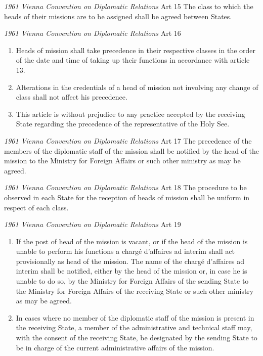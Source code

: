 \begin{conventiondetails}{\textit{1961 Vienna Convention on Diplomatic Relations} Art 15}
    \flushleft
    The class to which the heads of their missions are to be assigned shall be agreed between States.
\end{conventiondetails}

\begin{conventiondetails}{\textit{1961 Vienna Convention on Diplomatic Relations} Art 16}
    \flushleft
    \begin{enumerate}
        \item Heads of mission shall take precedence in their respective classes in the order of the date and time of taking up their functions in accordance with article 13.
        \item Alterations in the credentials of a head of mission not involving any change of class shall not affect his precedence.
        \item This article is without prejudice to any practice accepted by the receiving State regarding the precedence of the representative of the Holy See.
    \end{enumerate}
\end{conventiondetails}

\begin{conventiondetails}{\textit{1961 Vienna Convention on Diplomatic Relations} Art 17}
    \flushleft
    The precedence of the members of the diplomatic staff of the mission shall be notified by the head of the mission to the Ministry for Foreign Affairs or such other ministry as may be agreed.
\end{conventiondetails}

\begin{conventiondetails}{\textit{1961 Vienna Convention on Diplomatic Relations} Art 18}
    \flushleft
    The procedure to be observed in each State for the reception of heads of mission shall be uniform in respect of each class.
\end{conventiondetails}

\begin{conventiondetails}{\textit{1961 Vienna Convention on Diplomatic Relations} Art 19}
    \flushleft
    \begin{enumerate}
        \item  If the post of head of the mission is vacant, or if the head of the mission is unable to perform his functions a chargé d'affaires ad interim shall act provisionally as head of the mission. The name of the chargé d'affaires ad interim shall be notified, either by the head of the mission or, in case he is unable to do so, by the Ministry for Foreign Affairs of the sending State to the Ministry for Foreign Affairs of the receiving State or such other ministry as may be agreed.
        \item In cases where no member of the diplomatic staff of the mission is present in the receiving State, a member of the administrative and technical staff may, with the consent of the receiving State, be designated by the sending State to be in charge of the current administrative affairs of the mission.
    \end{enumerate}
\end{conventiondetails}

